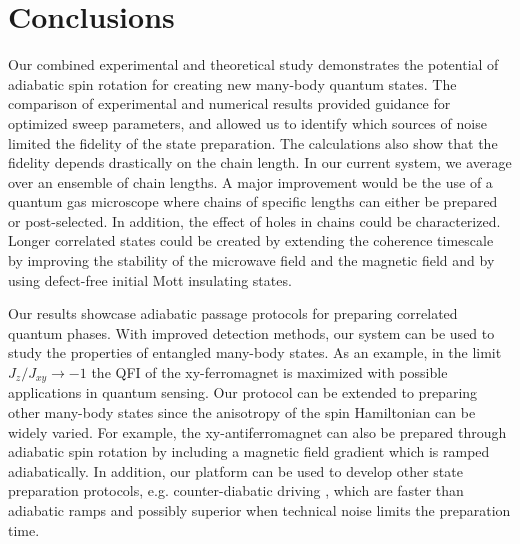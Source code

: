 \documentclass[12pt]{iopart}
\begin{document}
\section{Conclusions}
Our combined experimental and theoretical study demonstrates the potential of adiabatic spin rotation for creating new many-body quantum states. The comparison of experimental and numerical results provided guidance for optimized sweep parameters, and allowed us to identify which sources of noise limited the fidelity of the state preparation.  The calculations also show that the fidelity depends drastically on the chain length.  In our current system, we average over an ensemble of chain lengths.  A major improvement would be the use of a quantum gas microscope where chains of specific lengths can either be prepared or post-selected.  In addition, the effect of holes in chains could be characterized. Longer correlated states could be created by extending the coherence timescale by improving the stability of the microwave field and the magnetic field and by using defect-free initial Mott insulating states. 

Our results showcase adiabatic passage protocols for preparing correlated quantum phases. With improved detection methods, our system can be used to study the properties of entangled many-body states. As an example, in the limit $J_z/J_{xy} \rightarrow -1$ the QFI of the xy-ferromagnet is maximized with possible applications in quantum sensing.   Our protocol can be extended to preparing other many-body states since the anisotropy of the spin Hamiltonian can be widely varied. For example, the xy-antiferromagnet can also be prepared through adiabatic spin rotation by including a magnetic field gradient which is ramped adiabatically. In addition, our platform can be  used to develop other state preparation protocols, e.g. counter-diabatic driving \cite{berry09,demirplak03,ieva22},  which are faster than adiabatic ramps and possibly superior when technical noise limits the preparation time.

\end{document}
